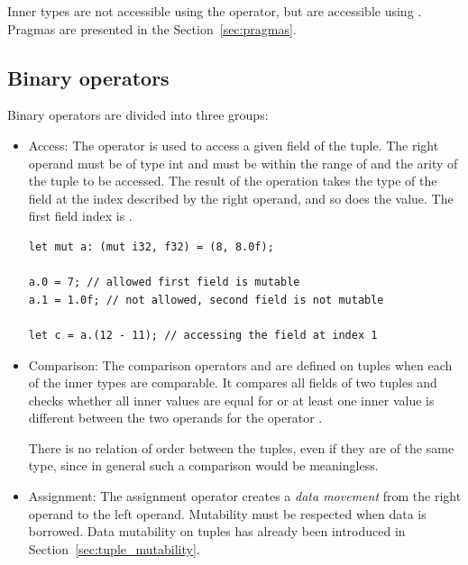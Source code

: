 \smallskip

Inner types are not accessible using the \token{::} operator, but are
accessible using . Pragmas are presented in the
Section~\ref{sec:pragmas}.

\subsection {Binary operators}

Binary operators are divided into three groups:
\begin{itemize}
  \setlength\itemsep{-4pt}
\item Access: The operator  is used to access a given field of the
  tuple. The right operand must be of type int and must be within the range of
   and the arity of the tuple to be accessed. The result of the
  operation takes the type of the field at the index described by the right
  operand, and so does the value. The first field index is .

  \begin{lstlisting}[style=coloredverbatimError, linewidth=0.95\linewidth]
let mut a: (mut i32, f32) = (8, 8.0f);

a.0 = 7; // allowed first field is mutable
a.1 = 1.0f; // not allowed, second field is not mutable

let c = a.(12 - 11); // accessing the field at index 1
  \end{lstlisting}

\item Comparison: The comparison operators \token{==} and \token{!=} are
  defined on tuples when each of the inner types are comparable. It compares all
  fields of two tuples and checks whether all inner values are equal for
  \token{==} or at least one inner value is different between the two operands
  for the operator \token{!=}.

  There is no relation of order between the tuples, even if they are of the same
  type, since in general such a comparison would be meaningless.

\item Assignment: The assignment operator creates a \textit{data movement}
  from the right operand to the left operand. Mutability must be respected when
  data is borrowed. Data mutability on tuples has already been introduced in
  Section~\ref{sec:tuple_mutability}.

\end{itemize}

